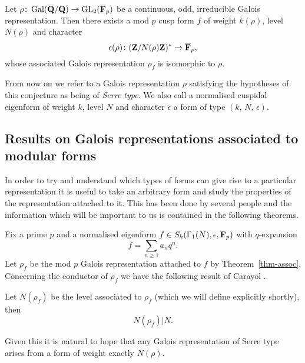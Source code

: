 \documentclass[a4paper,12pt]{article}
\begin{document}
\begin{conjecture}\label{conj-ref}
Let $\rho\colon \operatorname{Gal}(\overline{\mathbf{Q}}/\mathbf{Q}) \to \operatorname{GL}_2(\overline{\mathbf{F}}_p)$ be a continuous, odd, irreducible Galois representation.
Then there exists a mod $p$ cusp form $f$ of weight $k(\rho)$, level $N(\rho)$ and character
\[
\epsilon(\rho)\colon (\mathbf{Z}/N(\rho)\mathbf{Z})^* \to \overline{\mathbf{F}}_p,
\]
whose associated Galois representation $\rho_f$ is isomorphic to $\rho$.
\end{conjecture}


From now on we refer to a Galois representation $\rho$ satisfying the hypotheses of this conjecture as being of \emph{Serre type}.
We also call a normalised cuspidal eigenform of weight $k$, level $N$ and character $\epsilon$ a form of type $(k,\,N,\,\epsilon)$.%

\subsection{Results on Galois representations associated to modular forms}
In order to try and understand which types of forms can give rise to a particular representation it is useful to take an arbitrary form and study the properties of the representation attached to it.
This has been done by several people and the information which will be important to us is contained in the following theorems. %

Fix a prime $p$ and a normalised eigenform $f \in S_k(\Gamma_1(N), \epsilon, \mathbf{F}_p)$ with $q$-expansion %
\[
f = \sum_{n\ge 1} a_nq^n.
\]
Let $\rho_f$ be the mod $p$ Galois representation attached to $f$ by Theorem~\ref{thm-assoc}.
Concerning the conductor of $\rho_f$ we have the following result of Carayol \cite{Carayol}.

\begin{thm}
Let $N(\rho_f)$ be the level associated to $\rho_f$ (which we will define explicitly shortly), then
\[
N(\rho_f)|N.
\]
\end{thm}

Given this it is natural to hope that any Galois representation of Serre type arises from a form of weight exactly $N(\rho)$.
\end{document}
